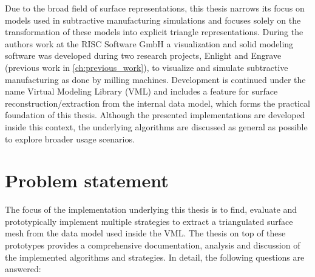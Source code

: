 Due to the broad field of surface representations, this thesis narrows its focus on models used in subtractive manufacturing simulations and focuses solely on the transformation of these models into explicit triangle representations.
During the authors work at the RISC Software GmbH a visualization and solid modeling software was developed during two research projects, Enlight and Engrave (\cf previous work in \cref{ch:previous_work}), to visualize and simulate subtractive manufacturing as done by milling machines.
Development is continued under the name Virtual Modeling Library (VML) and includes a feature for surface reconstruction/extraction from the internal data model, which forms the practical foundation of this thesis.
Although the presented implementations are developed inside this context, the underlying algorithms are discussed as general as possible to explore broader usage scenarios.


\section{Problem statement}
\label{sec:problem}

The focus of the implementation underlying this thesis is to find, evaluate and prototypically implement multiple strategies to extract a triangulated surface mesh from the data model used inside the VML.
The thesis on top of these prototypes provides a comprehensive documentation, analysis and discussion of the implemented algorithms and strategies.
In detail, the following questions are answered:

